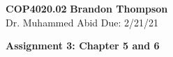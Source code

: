 \noindent
\textbf{COP4020.02} \hfill \textbf{Brandon Thompson} \\
\normalsize Dr. Muhammed Abid \hfill Due: 2/21/21\\

\begin{center}
\textbf{Assignment 3: Chapter 5 and 6}
\end{center}